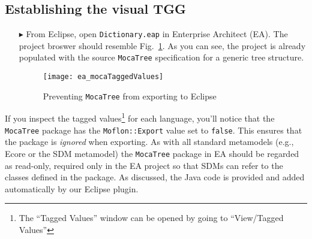 \newpage
\hypertarget{initialize vis}{}
\subsection{Establishing the visual TGG}
\visHeader

\begin{itemize}

\item[$\blacktriangleright$] From Eclipse, open \texttt{Dict\-ion\-ary.eap} in Enterprise Architect (EA). The project broswer should resemble
Fig.~\ref{ea:mocaTagged}. As you can see, the project is already populated with the source \texttt{MocaTree} specification for a generic tree structure.

\vspace{0.5cm}

\begin{figure}[htpb]
\begin{center}
  \texttt{[image: ea\_mocaTaggedValues]}
  \caption{Preventing \texttt{MocaTree} from exporting to Eclipse}
  \label{ea:mocaTagged}
\end{center}
\end{figure}

\end{itemize}
\vspace{-0.5cm}
If you inspect the tagged values\footnote{The ``Tagged Values'' window can be opened by going to ``View/Tagged Values''} for each language, you'll notice that
the \texttt{MocaTree} package has the \texttt{Moflon::Export} value set to \texttt{false}. This ensures that the package is \emph{ignored} when exporting. As
with all standard metamodels (e.g., Ecore or the SDM metamodel) the \texttt{MocaTree} package in EA should be regarded as read-only, required only in the
EA project so that SDMs can refer to the classes defined in the package. As discussed, the Java code is provided and added automatically by our Eclipse plugin.

